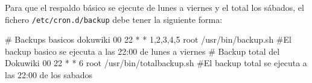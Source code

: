 Para que el respaldo básico se ejecute de lunes a viernes y el total los sábados, el fichero \texttt{/etc/cron.d/backup} debe tener la siguiente forma:

\begin{listing}
# Backups basicos dokuwiki
00  22 * * 1,2,3,4,5    root        /usr/bin/backup.sh
#El backup basico se ejecuta a las 22:00 de lunes a viernes
# Backup total del Dokuwiki
00 22  * * 6         root /usr/bin/totalbackup.sh
#El backup total se ejecuta a las 22:00 de los sabados
\end{listing}

\newpage